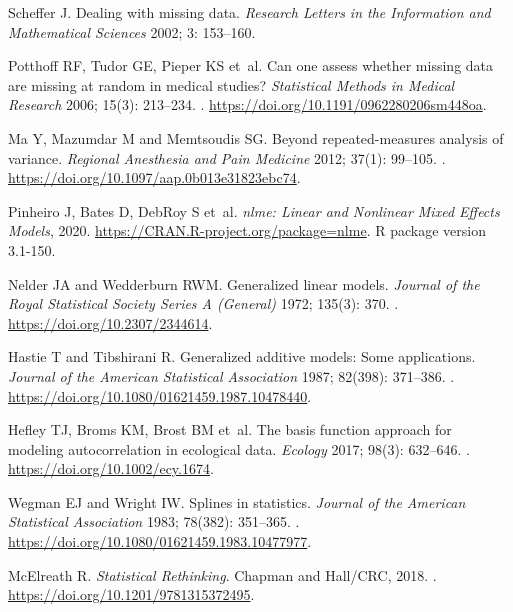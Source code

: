 \documentclass[Royal,times,doublespace,sagev]{sagej}
\begin{document}
\begin{thebibliography}{10}
Scheffer J.
\newblock Dealing with missing data.
\newblock \emph{Research Letters in the Information and Mathematical Sciences}
  2002; 3: 153--160.

Potthoff RF, Tudor GE, Pieper KS et~al.
\newblock Can one assess whether missing data are missing at random in medical
  studies?
\newblock \emph{Statistical Methods in Medical Research} 2006; 15(3): 213--234.
\newblock {}.
\newblock \urlprefix\url{https://doi.org/10.1191/0962280206sm448oa}.

Ma Y, Mazumdar M and Memtsoudis SG.
\newblock Beyond repeated-measures analysis of variance.
\newblock \emph{Regional Anesthesia and Pain Medicine} 2012; 37(1): 99--105.
\newblock {}.
\newblock \urlprefix\url{https://doi.org/10.1097/aap.0b013e31823ebc74}.

Pinheiro J, Bates D, DebRoy S et~al.
\newblock \emph{{nlme}: Linear and Nonlinear Mixed Effects Models}, 2020.
\newblock \urlprefix\url{https://CRAN.R-project.org/package=nlme}.
\newblock R package version 3.1-150.

Nelder JA and Wedderburn RWM.
\newblock Generalized linear models.
\newblock \emph{Journal of the Royal Statistical Society Series A (General)}
  1972; 135(3): 370.
\newblock {}.
\newblock \urlprefix\url{https://doi.org/10.2307/2344614}.

Hastie T and Tibshirani R.
\newblock Generalized additive models: Some applications.
\newblock \emph{Journal of the American Statistical Association} 1987; 82(398):
  371--386.
\newblock {}.
\newblock \urlprefix\url{https://doi.org/10.1080/01621459.1987.10478440}.

Hefley TJ, Broms KM, Brost BM et~al.
\newblock The basis function approach for modeling autocorrelation in
  ecological data.
\newblock \emph{Ecology} 2017; 98(3): 632--646.
\newblock {}.
\newblock \urlprefix\url{https://doi.org/10.1002/ecy.1674}.

Wegman EJ and Wright IW.
\newblock Splines in statistics.
\newblock \emph{Journal of the American Statistical Association} 1983; 78(382):
  351--365.
\newblock {}.
\newblock \urlprefix\url{https://doi.org/10.1080/01621459.1983.10477977}.

McElreath R.
\newblock \emph{Statistical Rethinking}.
\newblock Chapman and Hall/{CRC}, 2018.
\newblock {}.
\newblock \urlprefix\url{https://doi.org/10.1201/9781315372495}.


\end{thebibliography}
\end{document}
